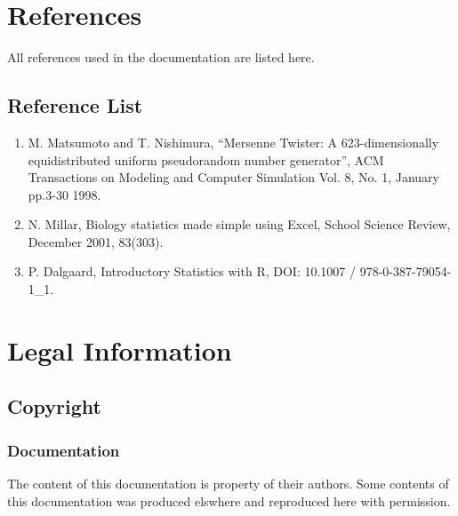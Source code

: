 \documentclass[letterpaper,10pt,english]{sphinxmanual}
\begin{document}
\section{References}
\label{references:references}\label{references::doc}
All references used in the documentation are listed here.


\subsection{Reference List}
\label{references:reference-list}\label{references:ref-mersenne-twister}\begin{enumerate}
\item {} 
M. Matsumoto and T. Nishimura, ``Mersenne Twister: A 623-dimensionally
equidistributed uniform pseudorandom number generator'', ACM Transactions on
Modeling and Computer Simulation Vol. 8, No. 1, January pp.3-30 1998.

\end{enumerate}
\label{references:ref-millar}\begin{enumerate}
\setcounter{enumi}{1}
\item {} 
N. Millar, Biology statistics made simple using Excel, School Science
Review, December 2001, 83(303).

\end{enumerate}
\label{references:ref-dalgaard}\begin{enumerate}
\setcounter{enumi}{2}
\item {} 
P. Dalgaard, Introductory Statistics with R, DOI: 10.1007 / 978-0-387-79054-1\_1.

\end{enumerate}


\section{Legal Information}
\label{legal::doc}\label{legal:legal-information}

\subsection{Copyright}
\label{legal:copyright}

\subsubsection{Documentation}
\label{legal:documentation}
The content of this documentation is property of their authors. Some
contents of this documentation was produced elswhere and reproduced here
with permission.
\end{document}
